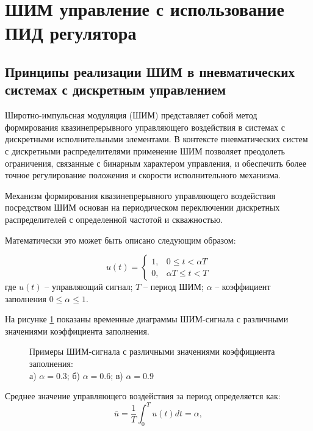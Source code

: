 \section{ШИМ управление с использование ПИД регулятора}\label{sec:ch3/sec2}

\subsection{Принципы реализации ШИМ в пневматических системах с дискретным управлением}\label{subsec:ch3/sec2/sub1}
Широтно-импульсная модуляция (ШИМ) представляет собой метод формирования квазинепрерывного
управляющего воздействия в системах с дискретными исполнительными элементами.
В контексте пневматических систем с дискретными распределителями применение ШИМ
позволяет преодолеть ограничения, связанные с бинарным характером управления, и обеспечить более
точное регулирование положения и скорости исполнительного механизма.

Механизм формирования квазинепрерывного управляющего воздействия
посредством ШИМ основан на периодическом переключении дискретных
распределителей с определенной частотой и скважностью.

Математически это может быть описано следующим образом:

\begin{equation*}
	u(t) = \begin{cases}
		1, & 0 \leq t < \alpha T \\
		0, & \alpha T \leq t < T
	\end{cases}
\end{equation*}
где $u(t)$ -- управляющий сигнал;
$T$ -- период ШИМ;
$\alpha$ -- коэффициент заполнения $0 \leq \alpha \leq 1$.

На рисунке \ref{fig:ch3:pwm_example} показаны временные диаграммы ШИМ-сигнала
с различными значениями коэффициента заполнения.

\begin{figure}[ht]
	\caption{Примеры ШИМ-сигнала с различными значениями коэффициента заполнения:\\ а) $\alpha = \num{0.3}$; б) $\alpha = \num{0.6}$; в) $\alpha = \num{0.9}$}
	\label{fig:ch3:pwm_example}
\end{figure}

Среднее значение управляющего воздействия за период определяется как:
\begin{equation*}
	\bar{u} = \frac{1}{T} \int_0^T u(t) dt = \alpha,
\end{equation*}

